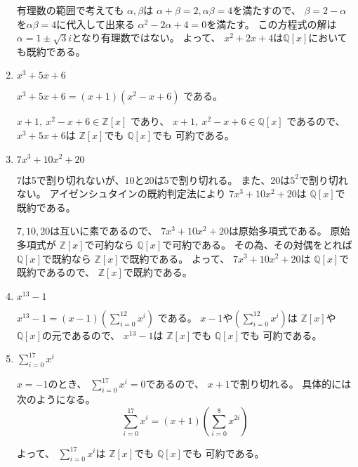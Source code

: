 \documentclass[12pt,b5paper]{ltjsarticle}
\begin{document}
\begin{enumerate}
       有理数の範囲で考えても
       $\alpha,\beta$は
       $\alpha+\beta=2,\alpha\beta=4$を満たすので、
       $\beta=2-\alpha$を$\alpha\beta=4$に代入して出来る
       $\alpha^2-2\alpha+4=0$を満たす。
       この方程式の解は$\alpha=1\pm\sqrt{3}i$となり有理数ではない。
       よって、
       $x^2+2x+4$は$\mathbb{Q}[x]$においても既約である。
       
 \item $x^3+5x+6$

       $x^3+5x+6 ={\left(x + 1\right)}{\left(x^{2} - x + 6\right)}$
       である。

       $x + 1,\ x^{2} - x + 6 \in\mathbb{Z}[x]$
       であり、
       $x + 1,\ x^{2} - x + 6 \in\mathbb{Q}[x]$
       であるので、
       $x^3+5x+6$は
       $\mathbb{Z}[x]$でも
       $\mathbb{Q}[x]$でも
       可約である。

 \item $7x^3+10x^2+20$

       7は5で割り切れないが、10と20は5で割り切れる。
       また、20は$5^2$で割り切れない。
       アイゼンシュタインの既約判定法により
       $7x^3+10x^2+20$は
       $\mathbb{Q}[x]$で既約である。

       $7,10,20$は互いに素であるので、
       $7x^3+10x^2+20$は原始多項式である。
       原始多項式が
       $\mathbb{Z}[x]$で可約なら
       $\mathbb{Q}[x]$で可約である。
       その為、その対偶をとれば
       $\mathbb{Q}[x]$で既約なら
       $\mathbb{Z}[x]$で既約である。
       よって、
       $7x^3+10x^2+20$は
       $\mathbb{Q}[x]$で既約であるので、
       $\mathbb{Z}[x]$で既約である。


 \item $x^{13}-1$

       $x^{13}-1 = (x - 1){\left( \sum_{i=0}^{12}x^i\right)}$
       である。
       $x - 1$や${\left( \sum_{i=0}^{12}x^i\right)}$は
       $\mathbb{Z}[x]$や$\mathbb{Q}[x]$の元であるので、
       $x^{13}-1$は
       $\mathbb{Z}[x]$でも
       $\mathbb{Q}[x]$でも
       可約である。

 \item $\sum_{i=0}^{17}x^i$

       $x=-1$のとき、
       $\sum_{i=0}^{17}x^i=0$であるので、
       $x+1$で割り切れる。
       具体的には次のようになる。
       \begin{equation}
        \sum_{i=0}^{17}x^i
         =(x+1)\left( \sum_{i=0}^{8}x^{2i} \right)
       \end{equation}

       よって、
       $\sum_{i=0}^{17}x^i$は
       $\mathbb{Z}[x]$でも
       $\mathbb{Q}[x]$でも
       可約である。


\end{enumerate}
\end{document}
